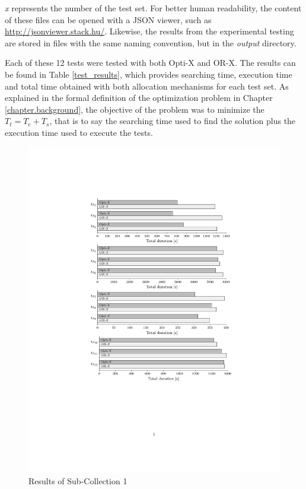 \noindent \emph{x} represents the number of the test set. For better human readability, the content of these files can be opened with a JSON viewer, such as \url{http://jsonviewer.stack.hu/}. Likewise, the results from the experimental testing are stored in files with the same naming convention, but in the \emph{output} directory.

Each of these 12 tests were tested with both Opti-X and OR-X. The results can be found in Table \ref{test_results}, which provides searching time, execution time and total time obtained with both allocation mechanisms for each test set. As explained in the formal definition of the optimization problem in Chapter \ref{chapter.background}, the objective of the problem was to minimize the $T_{t} = T_{e} + T_{s}$, that is to say the searching time used to find the solution plus the execution time used to execute the tests.

\begin{figure}[h]
    \centering
    \includegraphics[width=\textwidth]{figures/test_results/1st.pdf}
    \caption{Results of Sub-Collection 1}
    \label{1st_test_set}
\end{figure}

